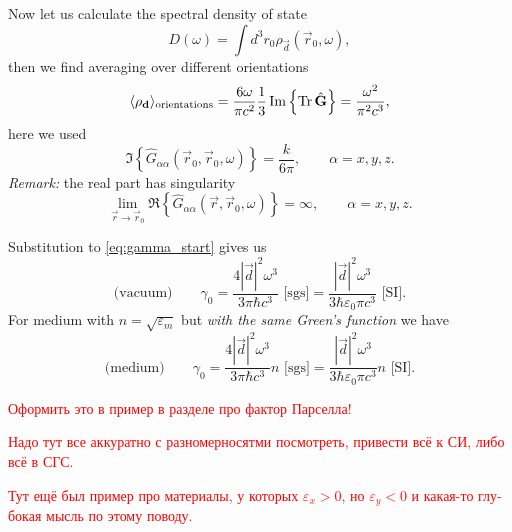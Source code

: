 Now let us calculate the spectral density of state
\begin{equation}
	D(\omega) = \int d^3 r_0 \rho_{\vec{d}} (\vec{r}_0, \omega),
\end{equation}
then we find averaging over different orientations
\begin{equation}
	\langle \rho_{\mathbf{d}} \rangle_{\text{orientations}} = \frac{6 \omega}{\pi c^2} \frac{1}{3} \operatorname{Im} \left\{ \operatorname{Tr} \hat{\mathbf{G}} \right\} = \frac{\omega^2}{\pi^2 c^3},
\end{equation}
here we used
\begin{equation}
	\Im \left\{ \hat{G}_{\alpha \alpha} (\vec{r}_0, \vec{r}_0, \omega) \right\} = \frac{k}{6 \pi}, \qquad \alpha = x,y,z.
\end{equation}
\textit{Remark:} the real part has singularity
\begin{equation}
	\lim\limits_{\vec{r}\to \vec{r}_0}\Re \left\{ \hat{G}_{\alpha \alpha} (\vec{r}, \vec{r}_0, \omega) \right\}  = \infty,  \qquad \alpha = x,y,z.
\end{equation} 

Substitution to \eqref{eq:gamma_start} gives us
\begin{equation}
	\text{(vacuum)} \qquad \gamma_0 = \frac{4 |\vec{d}|^2 \omega^3}{3 \pi \hbar c^3}  \text{ [sgs]} = \frac{|\vec{d}|^2 \omega^3}{3 \hbar \varepsilon_0 \pi c^3} \text{ [SI]}.
\end{equation}
For medium with $n = \sqrt{\varepsilon_m}$ but \textit{with the same Green's function} we have
\begin{equation}
\text{(medium)} \qquad \gamma_0 = \frac{4 |\vec{d}|^2 \omega^3}{3 \pi \hbar c^3}n  \text{ [sgs]} = \frac{|\vec{d}|^2 \omega^3}{3 \hbar \varepsilon_0 \pi c^3}n \text{ [SI]}.
\end{equation}
\begin{otherlanguage}{russian}	
	\textcolor{red}{Оформить это в пример в разделе про фактор Парселла!} 
\end{otherlanguage}

\begin{otherlanguage}{russian}	
	\textcolor{red}{Надо тут все аккуратно с разномерносятми посмотреть, привести всё к СИ, либо всё в СГС.}
\end{otherlanguage}

\begin{otherlanguage}{russian}	
	\textcolor{red}{Тут ещё был пример про материалы, у которых $\varepsilon_x>0$, но $\varepsilon_y<0$ и какая-то глубокая мысль по этому поводу.}
\end{otherlanguage}

